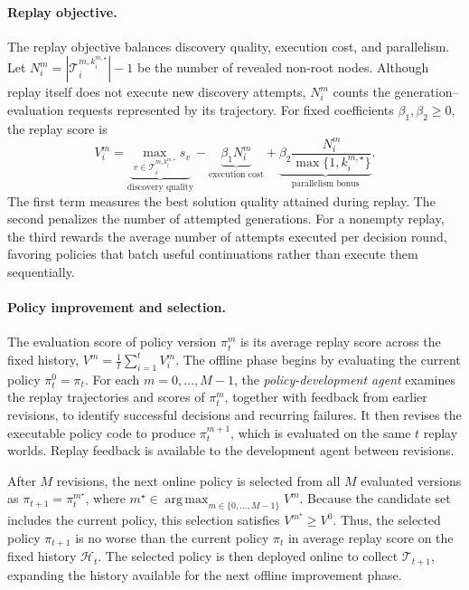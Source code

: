 \paragraph{Replay objective.}
The replay objective balances discovery quality, execution cost,
and parallelism. Let
\(N_i^m=|\mathcal T_i^{m,k_i^{m,\star}}|-1\)
be the number of revealed non-root nodes.
Although replay itself does not execute new discovery attempts,
\(N_i^m\) counts the generation--evaluation requests represented
by its trajectory.
For fixed coefficients \(\beta_1,\beta_2\geq 0\), the replay score is
\begin{equation}
    V_i^m
    =
    \underbrace{
        \max_{v\in\mathcal T_i^{m,k_i^{m,\star}}} s_v
    }_{\text{discovery quality}}
    -
    \underbrace{
        \beta_1 N_i^m
    }_{\text{execution cost}}
    +
    \underbrace{
        \beta_2
        \frac{N_i^m}{\max\{1,k_i^{m,\star}\}}
    }_{\text{parallelism bonus}}.
    \label{eq:dream-rsi-replay-score}
\end{equation}
The first term measures the best solution quality attained during
replay. The second penalizes the
number of attempted generations. For a nonempty replay, the third
rewards the average number of attempts executed per decision round,
favoring policies that batch useful continuations rather than
execute them sequentially.

\paragraph{Policy improvement and selection.}
The evaluation score of policy version \(\pi_t^m\) is its average
replay score across the fixed history,
\(V^m=\frac{1}{t}\sum_{i=1}^{t}V_i^m\).
The offline phase begins by evaluating the current policy
\(\pi_t^0=\pi_t\).
For each \(m=0,\ldots,M-1\), the \emph{policy-development agent} examines
the replay trajectories and scores of \(\pi_t^m\), together with
feedback from earlier revisions, to identify successful decisions
and recurring failures. It then revises the executable policy code
to produce \(\pi_t^{m+1}\), which is evaluated on the same
\(t\) replay worlds.
Replay feedback is available to the development agent between
revisions.

After \(M\) revisions, the next online policy is selected from all
\(M\) evaluated versions as \(\pi_{t+1}=\pi_t^{m^\star}\), where
\(m^\star\in\operatorname*{arg\,max}_{m\in\{0,\ldots,M-1\}}V^m\).
Because the candidate set includes the current policy, this
selection satisfies \(V^{m^\star}\geq V^0\).
Thus, the selected policy $\pi_{t+1}$ is no worse than the current policy $\pi_t$
in average replay score on the fixed history \(\mathcal H_t\). The selected policy is then deployed online to collect
\(\mathcal T_{t+1}\), expanding the history available for the next offline improvement phase.



